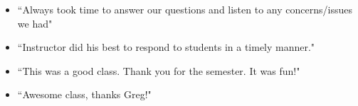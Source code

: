 \documentclass{res}
\begin{document}
\begin{resume}
\begin{itemize}
\item ``Always took time to answer our questions and listen to any concerns/issues we had"
\item ``Instructor did his best to respond to students in a timely manner."
\item ``This was a good class. Thank you for the semester. It was fun!"
\item ``Awesome class, thanks Greg!"
\end{itemize}
\end{resume}


\end{document}
